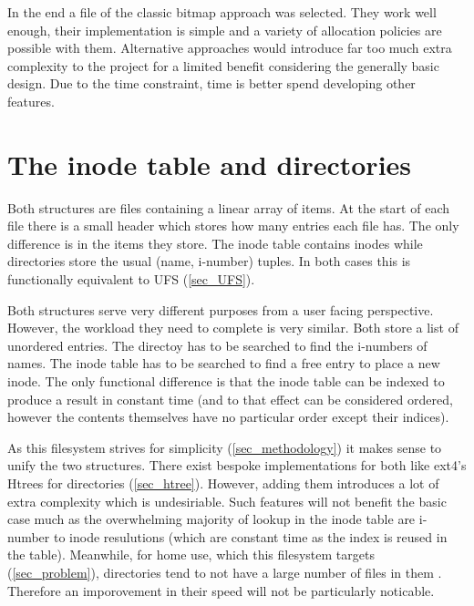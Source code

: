         In the end a file of the classic bitmap approach was selected. They
        work well enough, their implementation is simple and a variety of
        allocation policies are possible with them. Alternative approaches
        would introduce far too much extra complexity to the project for a
        limited benefit considering the generally basic design. Due to the time
        constraint, time is better spend developing other features.

    \section{The inode table and directories}

        Both structures are files containing a linear array of items. At the
        start of each file there is a small header which stores how many
        entries each file has. The only difference is in the items they store.
        The inode table contains inodes while directories store the usual
        (name, i-number) tuples. In both cases this is functionally equivalent
        to UFS (\ref{sec_UFS}).

        Both structures serve very different purposes from a user facing
        perspective. However, the workload they need to complete is very
        similar. Both store a list of unordered entries. The directoy has to be
        searched to find the i-numbers of names. The inode table has to be
        searched to find a free entry to place a new inode. The only functional
        difference is that the inode table can be indexed to produce a result
        in constant time (and to that effect can be considered ordered, however
        the contents themselves have no particular order except their indices).

        As this filesystem strives for simplicity (\ref{sec_methodology}) it
        makes sense to unify the two structures. There exist bespoke
        implementations for both like ext4's Htrees for directories
        (\ref{sec_htree}). However, adding them introduces a lot of extra
        complexity which is undesiriable. Such features will not benefit the
        basic case much as the overwhelming majority of lookup in the inode
        table are i-number to inode resulutions (which are constant time as the
        index is reused in the table). Meanwhile, for home use, which this
        filesystem targets (\ref{sec_problem}), directories tend to not have a
        large number of files in them \cite{contents_strudy}. Therefore an
        imporovement in their speed will not be particularly noticable.

